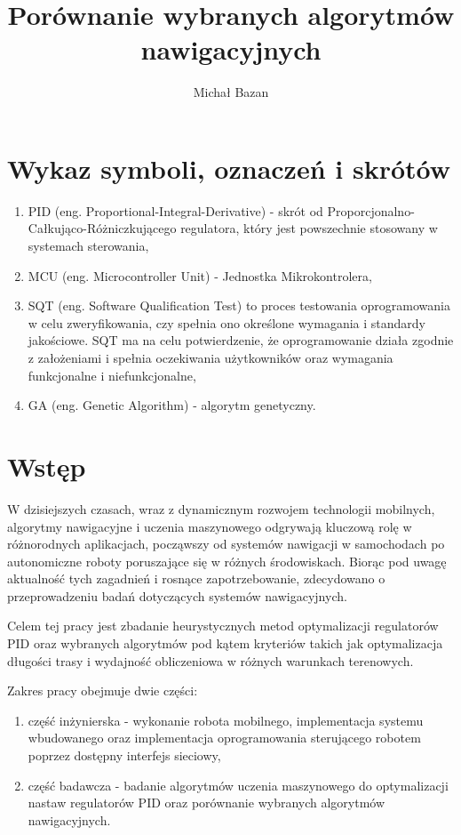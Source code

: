 \documentclass[12pt,twoside]{article}
\author{Michał Bazan}
\title{Porównanie wybranych algorytmów nawigacyjnych}
\begin{document}
\maketitle

\blankpage

\tableofcontents

\clearpage
\blankpage


\section*{Wykaz symboli, oznaczeń i skrótów}
\begin{enumerate}[label=\alph*), leftmargin=1.25cm]
	\item PID (eng. Proportional-Integral-Derivative) - skrót od Proporcjonalno-Całkująco-Różniczkującego regulatora, który jest powszechnie stosowany w systemach sterowania,
	\item MCU (eng. Microcontroller Unit) - Jednostka Mikrokontrolera,
	\item SQT (eng. Software Qualification Test) to proces testowania oprogramowania w celu zweryfikowania, czy spełnia ono określone wymagania i standardy jakościowe. SQT ma na celu potwierdzenie, że oprogramowanie działa zgodnie z założeniami i spełnia oczekiwania użytkowników oraz wymagania funkcjonalne i niefunkcjonalne,
	\item GA (eng. Genetic Algorithm) - algorytm genetyczny.
\end{enumerate}

\section{Wstęp}
W dzisiejszych czasach, wraz z dynamicznym rozwojem technologii mobilnych, algorytmy nawigacyjne i uczenia maszynowego \cite{deepLearning} odgrywają kluczową rolę w różnorodnych aplikacjach, począwszy od systemów nawigacji w samochodach po autonomiczne roboty poruszające się w różnych środowiskach. Biorąc pod uwagę aktualność tych zagadnień i rosnące zapotrzebowanie, zdecydowano o przeprowadzeniu badań dotyczących systemów nawigacyjnych.
   
Celem tej pracy jest zbadanie heurystycznych metod \cite{genetics} optymalizacji regulatorów PID oraz wybranych algorytmów pod kątem kryteriów takich jak optymalizacja długości trasy i wydajność obliczeniowa w różnych warunkach terenowych.  

Zakres pracy obejmuje dwie części:
\begin{enumerate}[label=\alph*), leftmargin=1.25cm]
	\item część inżynierska - wykonanie robota mobilnego, implementacja systemu wbudowanego oraz implementacja oprogramowania sterującego robotem poprzez dostępny interfejs sieciowy,
	\item część badawcza - badanie algorytmów uczenia maszynowego do optymalizacji nastaw regulatorów PID oraz porównanie wybranych algorytmów nawigacyjnych. 
\end{enumerate}
\end{document}
